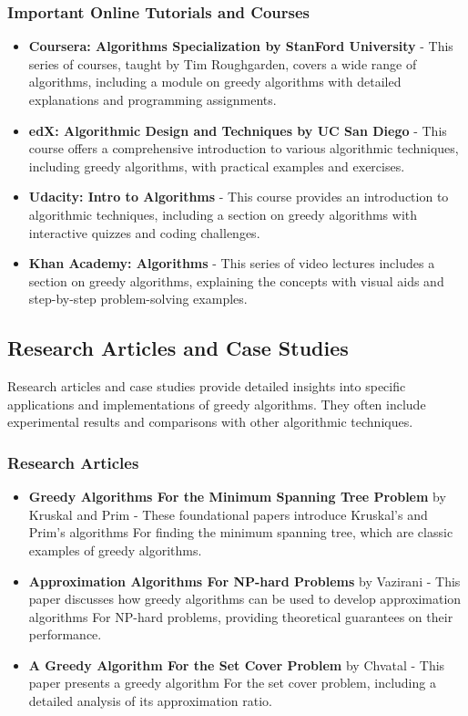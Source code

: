 \documentclass[12pt]{book} %
\begin{document}
\subsubsection*{Important Online Tutorials and Courses}
\begin{itemize}
    \item \textbf{Coursera: Algorithms Specialization by StanFord University} - This series of courses, taught by Tim Roughgarden, covers a wide range of algorithms, including a module on greedy algorithms with detailed explanations and programming assignments.
    \item \textbf{edX: Algorithmic Design and Techniques by UC San Diego} - This course offers a comprehensive introduction to various algorithmic techniques, including greedy algorithms, with practical examples and exercises.
    \item \textbf{Udacity: Intro to Algorithms} - This course provides an introduction to algorithmic techniques, including a section on greedy algorithms with interactive quizzes and coding challenges.
    \item \textbf{Khan Academy: Algorithms} - This series of video lectures includes a section on greedy algorithms, explaining the concepts with visual aids and step-by-step problem-solving examples.
\end{itemize}

\subsection{Research Articles and Case Studies}
Research articles and case studies provide detailed insights into specific applications and implementations of greedy algorithms. They often include experimental results and comparisons with other algorithmic techniques.

\subsubsection*{Research Articles}
\begin{itemize}
    \item \textbf{Greedy Algorithms For the Minimum Spanning Tree Problem} by Kruskal and Prim - These foundational papers introduce Kruskal's and Prim's algorithms For finding the minimum spanning tree, which are classic examples of greedy algorithms.
    \item \textbf{Approximation Algorithms For NP-hard Problems} by Vazirani - This paper discusses how greedy algorithms can be used to develop approximation algorithms For NP-hard problems, providing theoretical guarantees on their performance.
    \item \textbf{A Greedy Algorithm For the Set Cover Problem} by Chvatal - This paper presents a greedy algorithm For the set cover problem, including a detailed analysis of its approximation ratio.
\end{itemize}
\end{document}
